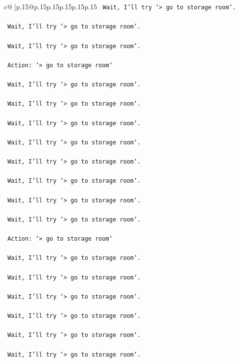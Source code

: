 \documentclass{article}
\begin{document}
{\begin{supertabular}{c@{$\;$}|p{.15\linewidth}@{}p{.15\linewidth}p{.15\linewidth}p{.15\linewidth}p{.15\linewidth}p{.15\linewidth}}
{{{\texttt{    Wait, I'll try `> go to storage room`.} \\
\\ 
\texttt{    Wait, I'll try `> go to storage room`.} \\
\\ 
\texttt{    Wait, I'll try `> go to storage room`.} \\
\\ 
\texttt{    Action: `> go to storage room`} \\
\\ 
\texttt{    Wait, I'll try `> go to storage room`.} \\
\\ 
\texttt{    Wait, I'll try `> go to storage room`.} \\
\\ 
\texttt{    Wait, I'll try `> go to storage room`.} \\
\\ 
\texttt{    Wait, I'll try `> go to storage room`.} \\
\\ 
\texttt{    Wait, I'll try `> go to storage room`.} \\
\\ 
\texttt{    Wait, I'll try `> go to storage room`.} \\
\\ 
\texttt{    Wait, I'll try `> go to storage room`.} \\
\\ 
\texttt{    Wait, I'll try `> go to storage room`.} \\
\\ 
\texttt{    Action: `> go to storage room`} \\
\\ 
\texttt{    Wait, I'll try `> go to storage room`.} \\
\\ 
\texttt{    Wait, I'll try `> go to storage room`.} \\
\\ 
\texttt{    Wait, I'll try `> go to storage room`.} \\
\\ 
\texttt{    Wait, I'll try `> go to storage room`.} \\
\\ 
\texttt{    Wait, I'll try `> go to storage room`.} \\
\\ 
\texttt{    Wait, I'll try `> go to storage room`.} \\
\\ 
}}}
\end{supertabular}}
\end{document}
